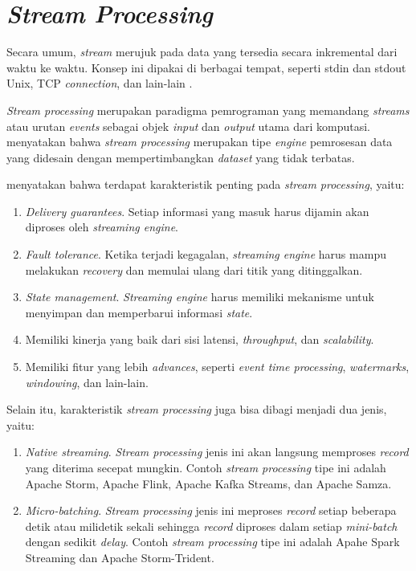 \section{\textit{Stream Processing}}

Secara umum, \textit{stream} merujuk pada data yang tersedia secara inkremental dari waktu ke waktu. Konsep ini dipakai di berbagai tempat, seperti stdin dan stdout Unix, TCP \textit{connection}, dan lain-lain \parencite{dataIntensiveApplications}.

\textit{Stream processing} merupakan paradigma pemrograman yang memandang \textit{streams} atau urutan \textit{events} sebagai objek \textit{input} dan \textit{output} utama dari komputasi. \cite{streaming101} menyatakan bahwa \textit{stream processing} merupakan tipe \textit{engine} pemrosesan data yang didesain dengan mempertimbangkan \textit{dataset} yang tidak terbatas.

\cite{streamProcessingComparison} menyatakan bahwa terdapat karakteristik penting pada \textit{stream processing}, yaitu:

\begin{enumerate}
    \item \textit{Delivery guarantees}. Setiap informasi yang masuk harus dijamin akan diproses oleh \textit{streaming engine}.
    \item \textit{Fault tolerance}. Ketika terjadi kegagalan, \textit{streaming engine} harus mampu melakukan \textit{recovery} dan memulai ulang dari titik yang ditinggalkan.
    \item \textit{State management}. \textit{Streaming engine} harus memiliki mekanisme untuk menyimpan dan memperbarui informasi \textit{state}.
    \item Memiliki kinerja yang baik dari sisi latensi, \textit{throughput}, dan \textit{scalability}.
    \item Memiliki fitur yang lebih \textit{advances}, seperti \textit{event time processing}, \textit{watermarks}, \textit{windowing}, dan lain-lain.
\end{enumerate}

Selain itu, karakteristik \textit{stream processing} juga bisa dibagi menjadi dua jenis, yaitu:

\begin{enumerate}
    \item \textit{Native streaming}. \textit{Stream processing} jenis ini akan langsung memproses \textit{record} yang diterima secepat mungkin. Contoh \textit{stream processing} tipe ini adalah Apache Storm, Apache Flink, Apache Kafka Streams, dan Apache Samza.
    \item \textit{Micro-batching}. \textit{Stream processing} jenis ini meproses \textit{record} setiap beberapa detik atau milidetik sekali sehingga \textit{record} diproses dalam setiap \textit{mini-batch} dengan sedikit \textit{delay}. Contoh \textit{stream processing} tipe ini adalah Apahe Spark Streaming dan Apache Storm-Trident.
\end{enumerate}

